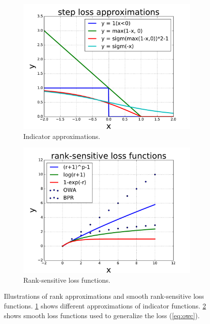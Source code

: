 \documentclass[letterpaper]{article}
\begin{document}
\begin{figure}
\centering
\begin{subfigure}{.25\textwidth}
  \centering
  \includegraphics[width=.99\linewidth]{pics/rapp-eps-converted-to}
  \caption{Indicator approximations.}
  \label{fig:rapp}
\end{subfigure}%
\begin{subfigure}{.25\textwidth}
  \centering
  \includegraphics[width=.99\linewidth]{pics/rsl-eps-converted-to}
  \caption{Rank-sensitive loss functions.}
  \label{fig:rsl}
\end{subfigure}
\caption{Illustrations of rank approximations and smooth rank-sensitive loss functions. \ref{fig:rapp} shows different approximations of indicator functions. \ref{fig:rsl} shows smooth loss functions used to generalize the loss (\ref{eq:owc}).}
\label{fig:approach}
\end{figure}
\end{document}
